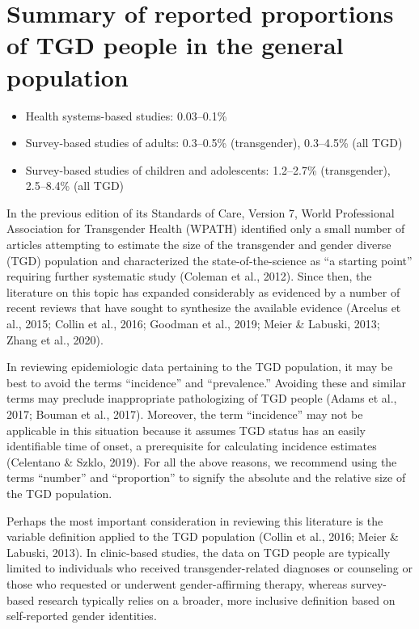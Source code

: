\documentclass[
]{book}
\providecommand{\tightlist}{%
  \setlength{\itemsep}{0pt}\setlength{\parskip}{0pt}}
\begin{document}
\hypertarget{summary-of-reported-proportions-of-tgd-people-in-the-general-population}{%
\section*{Summary of reported proportions of TGD people in the general population}\label{summary-of-reported-proportions-of-tgd-people-in-the-general-population}}

\begin{itemize}
\tightlist
\item
  Health systems-based studies: 0.03--0.1\%
\item
  Survey-based studies of adults: 0.3--0.5\% (transgender), 0.3--4.5\% (all TGD)
\item
  Survey-based studies of children and adolescents: 1.2--2.7\% (transgender), 2.5--8.4\% (all TGD)
\end{itemize}

In the previous edition of its Standards of Care,
Version 7, World Professional Association for
Transgender Health (WPATH) identified only a
small number of articles attempting to estimate
the size of the transgender and gender diverse
(TGD) population and characterized the
state-of-the-science as ``a starting point'' requiring
further systematic study (Coleman et al., 2012).
Since then, the literature on this topic has
expanded considerably as evidenced by a number
of recent reviews that have sought to synthesize
the available evidence (Arcelus et al., 2015; Collin
et al., 2016; Goodman et al., 2019; Meier \&
Labuski, 2013; Zhang et al., 2020).

In reviewing epidemiologic data pertaining to
the TGD population, it may be best to avoid the
terms ``incidence'' and ``prevalence.'' Avoiding
these and similar terms may preclude inappropriate pathologizing of TGD people (Adams
et al., 2017; Bouman et al., 2017). Moreover, the
term ``incidence'' may not be applicable in this
situation because it assumes TGD status has an
easily identifiable time of onset, a prerequisite
for calculating incidence estimates (Celentano \&
Szklo, 2019). For all the above reasons, we recommend using the terms ``number'' and ``proportion'' to signify the absolute and the relative size
of the TGD population.

Perhaps the most important consideration in
reviewing this literature is the variable definition
applied to the TGD population (Collin et al.,
2016; Meier \& Labuski, 2013). In clinic-based
studies, the data on TGD people are typically
limited to individuals who received
transgender-related diagnoses or counseling or
those who requested or underwent gender-affirming
therapy, whereas survey-based research typically
relies on a broader, more inclusive definition
based on self-reported gender identities.
\end{document}
